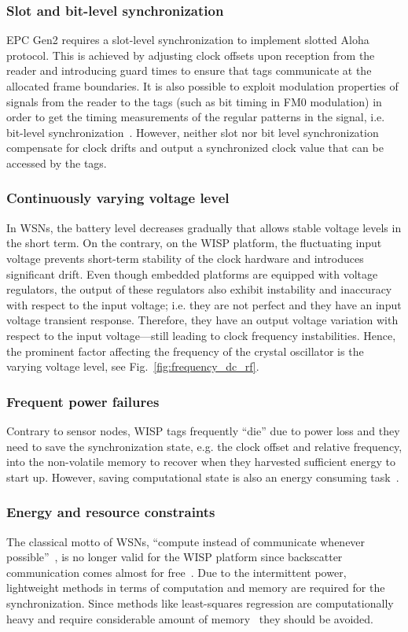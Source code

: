 \documentclass[10pt,journal,compsoc]{IEEEtran}
\begin{document}
\subsubsection{Slot and bit-level synchronization} EPC Gen2 requires a slot-level synchronization to implement slotted Aloha protocol. This is achieved by adjusting clock offsets upon reception from the reader and introducing guard times to ensure that tags communicate at the
allocated frame boundaries. It is also possible to exploit modulation properties of signals from the reader to the tags (such as bit timing in FM0 modulation) in order to get the timing measurements of the regular patterns in the signal, i.e. bit-level synchronization~\cite{liu_tcomp_2015,liu_ton_2017,liu2_ton_2017}. However, neither slot nor bit level synchronization compensate for clock drifts and output a synchronized clock value that can be accessed by the tags.

\subsubsection{Continuously varying voltage level} In WSNs, the battery level decreases gradually that allows stable voltage levels in the short term. On the contrary, on the WISP platform, the fluctuating input voltage prevents short-term stability of the clock hardware and introduces significant drift. Even though embedded platforms are equipped with voltage regulators, the output of these regulators also exhibit instability and inaccuracy with respect to the input voltage; i.e. they are not perfect and they have an input voltage transient response. Therefore, they have an output voltage variation with respect to the input voltage---still leading to clock frequency instabilities. Hence, the prominent factor affecting the frequency of the crystal oscillator is the varying voltage level, see Fig.~\ref{fig:frequency_dc_rf}.

\subsubsection{Frequent power failures} Contrary to sensor nodes, WISP tags frequently ``die'' due to power loss and they need to save the synchronization state, e.g. the clock offset and relative frequency, into the non-volatile memory to recover when they harvested sufficient energy to start up. However, saving computational state is also an energy consuming task~\cite{blisp}.

\subsubsection{Energy and resource constraints} The classical motto of WSNs, ``compute instead of communicate whenever possible''~\cite[p. 44]{karl2007protocols}, is no longer valid for the WISP platform since backscatter communication comes almost for free~\cite{ekhonet}. Due to the intermittent power, lightweight methods in terms of computation and memory are required for the synchronization. Since methods like least-squares regression are computationally heavy and require considerable amount of memory~\cite{pi2015} they should be avoided. 
\end{document}
